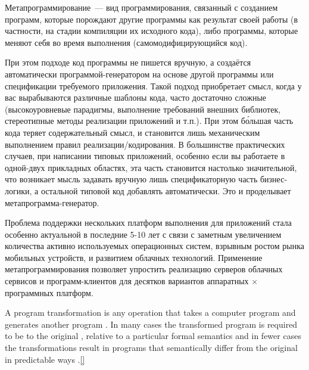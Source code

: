 \secdown

Метапрограммирование\ --- вид программирования, связанный с созданием программ,
которые порождают другие программы как результат своей работы (в частности, на
стадии компиляции их исходного кода), либо программы, которые меняют себя во
время выполнения (самомодифицирующийся код).


При этом подходе код программы не пишется вручную, а создаётся автоматически
программой-генератором на основе другой программы или спецификации требуемого
приложения. Такой подход приобретает смысл, когда у вас вырабываются различные
шаблоны кода, часто достаточно сложные (высокоуровневые парадигмы, выполнение
требований внешних библиотек, стереотипные методы реализации приложений и т.п.).
При этом б\'{о}льшая часть кода теряет содержательный смысл, и становится лишь
механическим выполнением правил реализации/кодирования. В большинстве
практических случаев, при написании типовых приложений, особенно если вы
работаете в одной-двух прикладных областях, эта часть становится настолько
значительной, что возникает мысль задавать вручную лишь спецификаторную часть
бизнес-логики, а остальной типовой код добавлять автоматически. Это и
проделывает метапрограмма-генератор.


Проблема поддержки нескольких платформ выполнения для приложений стала особенно
актуальной в последние 5-10 лет с связи с заметным увеличением количества
активно используемых операционных систем, взрывным ростом рынка мобильных
устройств, и развитием облачных технологий. Применение метапрограммирования
позволяет упростить реализацию серверов облачных сервисов и программ-клиентов
для десятков вариантов аппаратных $\times$ программных платформ.


A program transformation  is any operation  that takes a computer program  and generates another program .
In many cases  the transformed program is required to be
 to the original , relative to a
particular formal semantics  and in fewer cases  the transformations
result in programs that semantically differ from the original in predictable
ways .\ref{}


